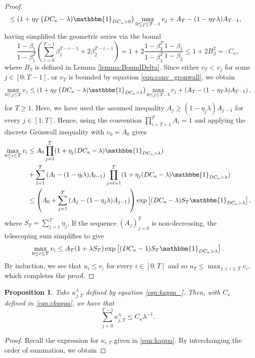 \documentclass{article}
\newtheorem{proposition}[theorem]{Proposition}
\begin{document}
\begin{appendices}
\begin{proof}
\begin{align}
    &\le(1+\eta_T\left( DC_\kappa-\lambda)\mathbbm{1}_{DC_{\kappa}>0}\right)\max_{0\le j\le T-1}v_j+A_T-(1-\eta_T\lambda)A_{T-1},\label{eqn:conv_gronwall}
\end{align}
having simplified the geometric series via the bound
\begin{equation}\label{eqn:ckappa}
    \frac{1-\beta_1}{1-\beta_1^T}\left(\sum_{i=0}^{T-1}\beta_1^{T-i-1}+2\beta_2^{T-i-1}\right)=1+2\frac{1-\beta_2^T}{1-\beta_1^T}\frac{1-\beta_1}{1-\beta_2}\le 1+2B_\beta^2 =:C_\kappa,
\end{equation}
where $B_\beta$ is defined in Lemma \ref{lemma:BoundDelta}. Since either $v_T<v_j$ for some $j\in[0:T-1]$, or $v_T$ is bounded by equation \eqref{eqn:conv_gronwall}, we obtain
\[
\max_{0\le j \le T} v_j\le(1+\eta_T\left( DC_\kappa-\lambda)\mathbbm{1}_{DC_\kappa>\lambda}\right)\max_{0\le j\le T-1}v_j+\left(A_T-(1-\eta_T\lambda)A_{T-1}\right),\]
for $T\ge 1$. Here, we have used the assumed inequality $A_j\ge (1-\eta_j\lambda)A_{j-1}$ for every $j\in[1:T]$. Hence,  using the convention $\prod_{i=T+1}^TA_i=1$ and applying the discrete Gr\"onwall inequality with $v_0=A_0$ gives
\begin{align*}
    \max_{0\le i \le T}v_i &\le A_0\prod_{j=1}^T(1+\eta_j(DC_\kappa-\lambda)\mathbbm{1}_{DC_\kappa>\lambda})\\&+
    \sum_{l=1}^T\left(A_l-(1-\eta_l\lambda)A_{l-1}\right)\prod_{j=l+1}^{T}(1+\eta_j(DC_\kappa-\lambda)\mathbbm{1}_{DC_\kappa>\lambda})\\
    &\le \left(A_0+\sum_{j=1}^T\left(A_j-(1-\eta_j\lambda)A_{j-1}\right)\right)\exp\left[(DC_\kappa-\lambda)S_T\mathbbm{1}_{DC_\kappa>\lambda}\right],
\end{align*}
where $S_T=\sum_{j=1}^T\eta_j$. If the sequence $(A_j)_{j=0}^T$ is non-decreasing, the telescoping sum simplifies to give
\[
\max_{0\le i \le T}v_i\le A_T(1+\lambda S_T)\exp\left[(DC_\kappa-1)S_T\mathbbm{1}_{DC_\kappa>\lambda}\right].
\]
By induction, we see that $u_i\le v_i$ for every $i\in[0:T]$ and so $u_T\le \max_{1\le i \le T}v_i$, which completes the proof.
\end{proof}
\begin{proposition}\label{prop:KappaSum}
Take $\kappa^\lambda_{j,T}$ defined by equation \eqref{eqn:kappa_}. Then, with  $C_\kappa$ defined in \eqref{eqn:ckappa}, we have that 
\[
\sum_{j=0}^{T-1}\kappa^\lambda_{j,T}\le C_\kappa\lambda^{-1}.
\]
\end{proposition}
\begin{proof}
Recall the expression for $\kappa_{i,T}$ given in \eqref{eqn:kappa}. By interchanging the order of summation, we obtain

\end{proof}
\end{appendices}
\end{document}
